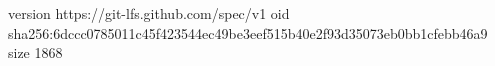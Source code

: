 version https://git-lfs.github.com/spec/v1
oid sha256:6dccc0785011c45f423544ec49be3eef515b40e2f93d35073eb0bb1cfebb46a9
size 1868

